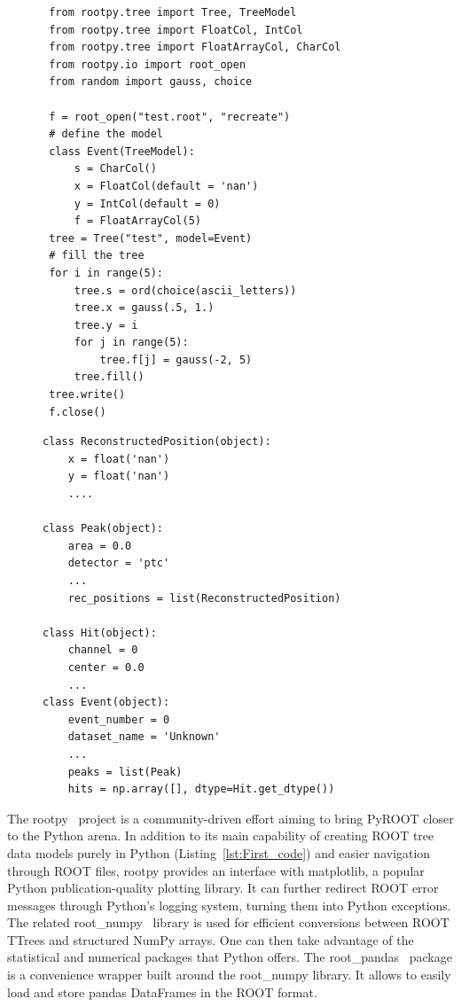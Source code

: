 \documentclass[a4paper]{jpconf}
\begin{document}
\begin{figure}[!h]
 \begin{minipage}{0.5\textwidth}
  \centering
  \begin{verbatim}
 from rootpy.tree import Tree, TreeModel
 from rootpy.tree import FloatCol, IntCol
 from rootpy.tree import FloatArrayCol, CharCol
 from rootpy.io import root_open
 from random import gauss, choice

 f = root_open("test.root", "recreate")
 # define the model
 class Event(TreeModel):
     s = CharCol()
     x = FloatCol(default = 'nan')
     y = IntCol(default = 0)
     f = FloatArrayCol(5)
 tree = Tree("test", model=Event)
 # fill the tree
 for i in range(5):
     tree.s = ord(choice(ascii_letters))
     tree.x = gauss(.5, 1.)
     tree.y = i
     for j in range(5):
         tree.f[j] = gauss(-2, 5)
     tree.fill()
 tree.write()
 f.close()
  \end{verbatim}
  \label{lst:First_code}
 \end{minipage}
 \begin{minipage}{0.5\textwidth}
  \centering
  \begin{verbatim}
class ReconstructedPosition(object):
    x = float('nan') 
    y = float('nan') 
    ....

class Peak(object):
    area = 0.0
    detector = 'ptc'
    ...
    rec_positions = list(ReconstructedPosition)

class Hit(object):
    channel = 0
    center = 0.0
    ...
class Event(object):
    event_number = 0
    dataset_name = 'Unknown'
    ...
    peaks = list(Peak)
    hits = np.array([], dtype=Hit.get_dtype())

    \end{verbatim}
  \label{lst:Second_code}
 \end{minipage}
  \label{lst:representation_examples}
\end{figure}

The rootpy~\cite{noel-dawe-2015-18815} project is a community-driven effort aiming to bring PyROOT
closer to the Python arena. In addition to its main capability 
of creating ROOT tree data models purely in Python (Listing~\ref{lst:First_code}) and easier navigation through ROOT files, rootpy provides an 
interface with matplotlib, a popular Python publication-quality plotting library. It can further redirect ROOT error messages through
Python's logging system, turning them into Python exceptions. The related root\_numpy~\cite{noel-dawe-2015-31192}
library is used for efficient conversions between ROOT TTrees and structured NumPy arrays. One can then
take advantage of the statistical and numerical packages that Python offers.
The root\_pandas~\cite{igor-babuschkin-2016-45464} package is a convenience wrapper built around the root\_numpy library. 
It allows to easily load and store pandas DataFrames in the ROOT format.
\end{document}
